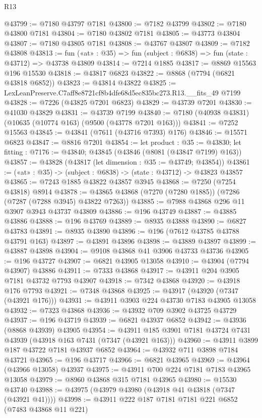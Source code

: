 \begin{lexlean}{R13}
\begin{coremodule}
@43799 := @7180 @43797 @7181
@43800 := @7182 @43799
@43802 := @7180 @43800 @7181
@43804 := @7180 @43802 @7181
@43805 := @43773 @43804
@43807 := @7180 @43805 @7181
@43808 := @43767 @43807
@43809 := @7182 @43808
@43813 := fun («at» : @35) => fun (subject : @6838) => fun (state : @43712) => @43738 @43809
@43814 := @7214 @1885
@43817 := @8869 @15563 @196 @15530
@43818 := @43817 @6823
@43822 := @8868 (@7794 (@6821 @43818 @6852))
@43823 := @43814 @43822
@43825 := LexLeanPreserve.C7aff8e8721cf8b4dfe68d5ec835bc273.R13.__fits_49 @7199
@43828 := @7226 (@43825 @7201 @6823)
@43829 := @43739 @7201
@43830 := @41030 @43829
@43831 := @43739 @7199
@43840 := @7180 (@40938 @43831) (@10635 (@10774 @163) (@9500 (@43778 @7201 @163)))
@43841 := @7252 @15563
@43845 := @43841 (@7611 (@43716 @7393) @176)
@43846 := @15571 @6823
@43847 := @8816 @7201
@43854 := let product : @35 := @43830;
  let fitting : @7176 := @43840; @43845 (@43846 (@8081 (@43847 @7199) @163))
@43857 := @43828 (@43817 (let dimension : @35 := @43749; @43854))
@43861 := («at» : @35) -> (subject : @6838) -> (state : @43712) -> @43823 @43857
@43865 := @7243 @1885 @43822 @43857 @3945
@43868 := @7250 (@7254 @43818) @8914
@43878 := @43865 @43868 (@7270 (@7280 @1885)) (@7286 (@7287 (@7288 @3945) @43822 @7263))
@43885 := @7988 @43868 @296 @11 @3907 @3943 @43737 @43809
@43886 := @196 @43749
@43887 := @43885 @43886
@43888 := @196 @43769
@43889 := @8935 @43888
@43890 := @6827 @43783
@43891 := @8935 @43890
@43896 := @196 (@7612 @43785 @43788 @43791 @163)
@43897 := @43891 @43896
@43898 := @43889 @43897
@43899 := @43887 @43898
@43904 := @9108 @43868 @41 @3906 @43733 @43736
@43905 := @196 @43727
@43907 := @6821 @43905 @13058
@43910 := @43904 (@7794 @43907) @43886
@43911 := @7333 @43868
@43917 := @43911 @204 @3905 @7181 @43732 @7793 @43907
@43918 := @7342 @43868
@43920 := @43918 @176 @7793
@43921 := @7348 @43868
@43925 := @43917 (@43920 (@7347 (@43921 @176)))
@43931 := @43911 @3903 @224 @43730 @7183 @43905 @13058
@43932 := @7323 @43868
@43936 := @43932 @709 @3902 @43725 @43729
@43937 := @196 @43719
@43939 := @6821 @43937 @6852
@43942 := @43936 (@8868 @43939) @43905
@43954 := @43911 @185 @3901 @7181 @43724 @7431 @43939 (@43918 @163 @7431 (@7347 (@43921 @163)))
@43960 := @43911 @3899 @187 @43722 @7181 @43937 @6852
@43964 := @43932 @711 @3898 @7184 @43721
@43965 := @196 @43717
@43966 := @6821 @43965
@43969 := @43964 (@43966 @13058) @43937
@43975 := @43911 @700 @224 @7181 @7183 @43965 @13058
@43979 := @8960 @43868 @315 @7181 @43965
@43980 := @15530 @43740
@43988 := @43975 (@43979 @43980 (@43918 @41 @43818 (@7347 (@43921 @41))))
@43998 := @43911 @222 @187 @7181 @7181 @221 @6852 (@7483 @43868 @11 @221)

\end{coremodule}
\end{lexlean}
